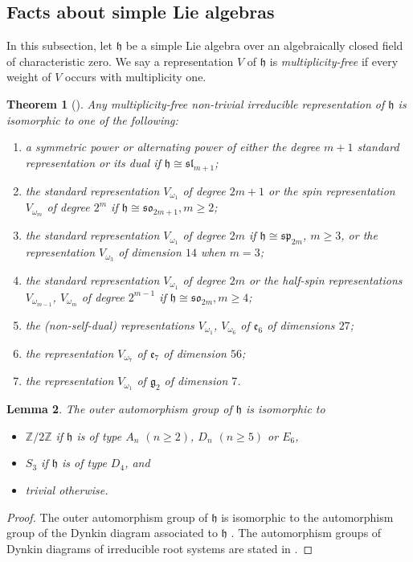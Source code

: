 \documentclass{amsart}
\newtheorem{theorem}{Theorem}[section]
\newtheorem{lemma}[theorem]{Lemma}
\theoremstyle{definition}
\numberwithin{equation}{section} %
\newcommand{\sllie}{\mathfrak{sl}}
\newcommand{\splie}{\mathfrak{sp}}
\newcommand{\solie}{\mathfrak{so}}
\newcommand{\bb}[1]{\mathbb{#1}}
\newcommand{\mf}[1]{\mathfrak{#1}}
\begin{document}
\subsection{Facts about simple Lie algebras}

In this subsection, let $\mf{h}$ be a simple Lie algebra over an algebraically closed field of characteristic zero.
We say a representation $V$ of $\mf{h}$ is \emph{multiplicity-free} if every weight of $V$ occurs with multiplicity one.

\begin{theorem}[{\cite[Theorem 2.2]{sun2024descriptions}}] \label{thm: multiplicity-free irreps}
Any multiplicity-free non-trivial irreducible representation of $\mf{h}$ is isomorphic to one of the following:
\begin{enumerate}
\item a symmetric power or alternating power of either the degree $m+1$ standard representation or its dual if $\mf{h} \cong \sllie_{m+1}$;
\item the standard representation $V_{\omega_1}$ of degree $2m+1$ or the spin representation $V_{\omega_m}$ of degree $2^m$ if $\mf{h} \cong \solie_{2m+1}, m \geq 2$;

\item the standard representation \( V_{\omega_1} \) of degree $2m$ if $\mf{h} \cong \splie_{2m}$, $m \geq 3$, or the representation \( V_{\omega_3} \) of dimension $14$ when $m=3$;
\item the standard representation \( V_{\omega_1} \) of degree $2m$ or the half-spin representations \( V_{\omega_{m-1}} \), \( V_{\omega_m} \) of degree $2^{m-1}$ if $\mf{h} \cong \solie_{2m}, m \geq 4$;
\item the (non-self-dual) representations \( V_{\omega_1} \), \( V_{\omega_6} \) of $\mf{e}_6$ of dimensions $27$;
\item the representation \( V_{\omega_7} \) of $\mf{e}_7$ of dimension \(56\);
\item the representation \( V_{\omega_1} \) of $\mf{g}_2$ of dimension \(7\).
\end{enumerate}    
\end{theorem}

\begin{lemma} \label{lemma: outer automorphisms simple lie algebras}
The outer automorphism group of $\mf{h}$ is isomorphic to
\begin{itemize}
    \item $\mathbb{Z}/2\bb{Z}$ if $\mf{h}$ is of type $A_n$ $(n \geq 2)$, $D_n$ $(n \geq 5)$ or $E_6$,
    \item $S_3$ if $\mf{h}$ is of type $D_4$, and
    \item trivial otherwise.
\end{itemize}
\end{lemma}
\begin{proof}
The outer automorphism group of $\mf{h}$ is isomorphic to the automorphism group of the Dynkin diagram associated to $\mf{h}$ \cite[Proposition D.40]{fulton2013representation}.
The automorphism groups of Dynkin diagrams of irreducible root systems are stated in \cite[\S 12.2]{humphreys2012introduction}.
\end{proof}
\end{document}
